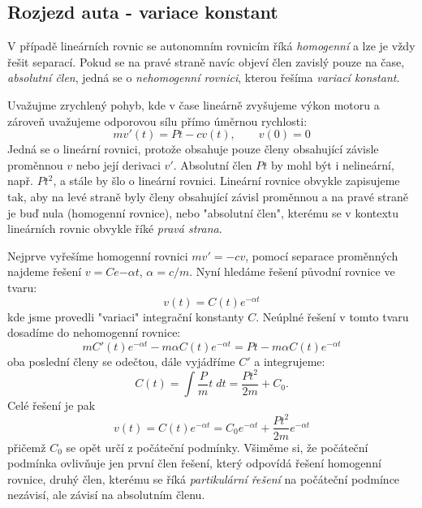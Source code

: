\documentclass[a4paper, 12pt]{book}
\theoremstyle{definition}
\def\df#1{\emph{#1}}
\begin{document}
\subsection{Rozjezd auta - variace konstant}
V případě lineárních rovnic se autonomním rovnicím říká \df{homogenní} a lze je vždy řešit separací. Pokud se na pravé straně navíc objeví člen
zavislý pouze na čase, \df{absolutní člen}, jedná se o \df{nehomogenní rovnici}, kterou řešíma \df{variací konstant}.

Uvažujme zrychlený pohyb, kde v čase lineárně zvyšujeme výkon motoru a zároveň uvažujeme odporovou sílu přímo úměrnou rychlosti:
\[
  mv'(t) = Pt - c v(t), \qquad v(0)=0
\]
Jedná se o lineární rovnici, protože obsahuje pouze členy obsahující závisle proměnnou $v$ nebo její derivaci $v'$. Absolutní člen $Pt$ by mohl být i nelineární,
např. $Pt^2$, a stále by šlo o lineární rovnici. Lineární rovnice obvykle zapisujeme tak, aby na levé straně byly členy obsahující závisl proměnnou a na pravé straně je buď nula (homogenní rovnice),
nebo "absolutní člen", kterému se v kontextu lineárních rovnic obvykle říké \df{pravá strana}.

Nejprve vyřešíme homogenní rovnici $mv'= - cv$, pomocí separace proměnných najdeme řešení $ v=Ce{-\alpha t}$, $\alpha = c/m$. Nyní hledáme řešení původní rovnice ve tvaru:
\[
   v(t) = C(t) e^{-\alpha t}
\]
kde jsme provedli "variaci" integrační konstanty $C$. Neúplné řešení v tomto tvaru dosadíme do nehomogenní rovnice:
\[
  m C'(t) e^{-\alpha t} - m \alpha C(t) e^{-\alpha t} = Pt - m \alpha C(t) e^{-\alpha t}
\]
oba poslední členy se odečtou, dále vyjádříme $C'$ a integrujeme:
\[
  C(t) = \int \frac{P}{m} t \; dt = \frac{P t^2}{2m} + C_0.
\]
Celé řešení je pak
\[
  v(t) = C(t) e^{-\alpha t} = C_0 e^{-\alpha t} + \frac{Pt^2}{2m} e^{-\alpha t}
\]
přičemž $C_0$ se opět určí z počáteční podmínky. Všiměme si, že počáteční podmínka ovlivňuje jen první člen řešení, který odpovídá řešení 
homogenní rovnice, druhý člen, kterému se říká \df{partikulární řešení} na počáteční podmínce nezávisí, ale závisí na absolutním členu. 
\end{document}
